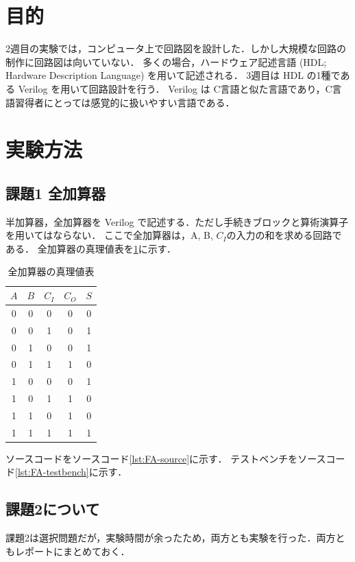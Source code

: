 \section{目的}
2週目の実験では，コンピュータ上で回路図を設計した．しかし大規模な回路の制作に回路図は向いていない．
多くの場合，ハードウェア記述言語 (HDL; Hardware Description Language) を用いて記述される．
3週目は HDL の1種である Verilog を用いて回路設計を行う．
Verilog は C言語と似た言語であり，C言語習得者にとっては感覚的に扱いやすい言語である．

\section{実験方法}

\subsection{課題1 全加算器}
半加算器，全加算器を Verilog で記述する．ただし手続きブロックと算術演算子を用いてはならない．
ここで全加算器は，A, B, $C_I$の入力の和を求める回路である．
全加算器の真理値表を\ref{tab:FA}に示す．

\begin{table}[htb]
  \centering
  \caption{全加算器の真理値表}
  \label{tab:FA}
  \begin{tabular}{ccc|cc}
    $A$ & $B$ & $C_I$ & $C_O$ & $S$ \\ \hline
     0  &  0  &  0  &  0    &  0\\
     0  &  0  &  1  &  0    &  1\\
     0  &  1  &  0  &  0    &  1\\
     0  &  1  &  1  &  1    &  0\\
     1  &  0  &  0  &  0    &  1\\
     1  &  0  &  1  &  1    &  0\\
     1  &  1  &  0  &  1    &  0\\
     1  &  1  &  1  &  1    &  1\\
  \end{tabular}
\end{table}

ソースコードをソースコード\ref{lst:FA-source}に示す．
テストベンチをソースコード\ref{lst:FA-testbench}に示す．


\subsection{課題2について}
課題2は選択問題だが，実験時間が余ったため，両方とも実験を行った．両方ともレポートにまとめておく．

